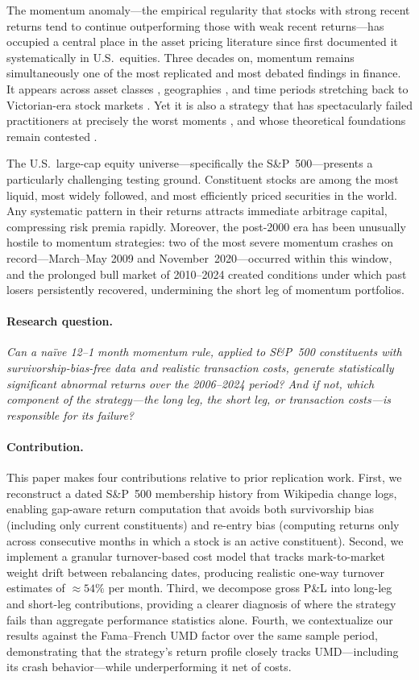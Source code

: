 \documentclass[11pt]{article}
\begin{document}
The momentum anomaly---the empirical regularity that stocks with strong recent returns
tend to continue outperforming those with weak recent returns---has occupied a central
place in the asset pricing literature since \citet{Jegadeesh1993} first documented it
systematically in U.S.\ equities. Three decades on, momentum remains simultaneously one
of the most replicated and most debated findings in finance. It appears across asset
classes \citep{Asness2013}, geographies \citep{Rouwenhorst1998}, and time periods
stretching back to Victorian-era stock markets \citep{Geczy2013}. Yet it is also a
strategy that has spectacularly failed practitioners at precisely the worst moments
\citep{Daniel2016}, and whose theoretical foundations remain contested
\citep{Barberis1998,Hong1999}.

The U.S.\ large-cap equity universe---specifically the S\&P~500---presents a
particularly challenging testing ground. Constituent stocks are among the most
liquid, most widely followed, and most efficiently priced securities in the world.
Any systematic pattern in their returns attracts immediate arbitrage capital, compressing
risk premia rapidly. Moreover, the post-2000 era has been unusually hostile to momentum
strategies: two of the most severe momentum crashes on record---March--May 2009 and
November~2020---occurred within this window, and the prolonged bull market of 2010--2024
created conditions under which past losers persistently recovered, undermining the
short leg of momentum portfolios.

\paragraph{Research question.}
\emph{Can a na\"ive 12--1 month momentum rule, applied to S\&P~500 constituents with
survivorship-bias-free data and realistic transaction costs, generate statistically
significant abnormal returns over the 2006--2024 period? And if not, which component
of the strategy---the long leg, the short leg, or transaction costs---is responsible
for its failure?}

\paragraph{Contribution.}
This paper makes four contributions relative to prior replication work. First, we
reconstruct a dated S\&P~500 membership history from Wikipedia change logs, enabling
gap-aware return computation that avoids both survivorship bias (including only
current constituents) and re-entry bias (computing returns only across consecutive
months in which a stock is an active constituent). Second, we implement a granular
turnover-based cost model that tracks mark-to-market weight drift between rebalancing
dates, producing realistic one-way turnover estimates of $\approx54\%$ per month.
Third, we decompose gross P\&L into long-leg and short-leg contributions, providing
a clearer diagnosis of where the strategy fails than aggregate performance statistics
alone. Fourth, we contextualize our results against the Fama--French UMD factor
over the same sample period, demonstrating that the strategy's return profile closely
tracks UMD---including its crash behavior---while underperforming it net of costs.
\end{document}
